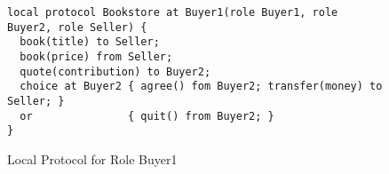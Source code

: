 \begin{figure}[t]
\begin{lstlisting}
local protocol Bookstore at Buyer1(role Buyer1, role Buyer2, role Seller) {
  book(title) to Seller;
  book(price) from Seller;
  quote(contribution) to Buyer2;
  choice at Buyer2 { agree() fom Buyer2; transfer(money) to Seller; }
  or               { quit() from Buyer2; }
}
\end{lstlisting}
	\caption{Local Protocol for Role Buyer1}
\end{figure}
